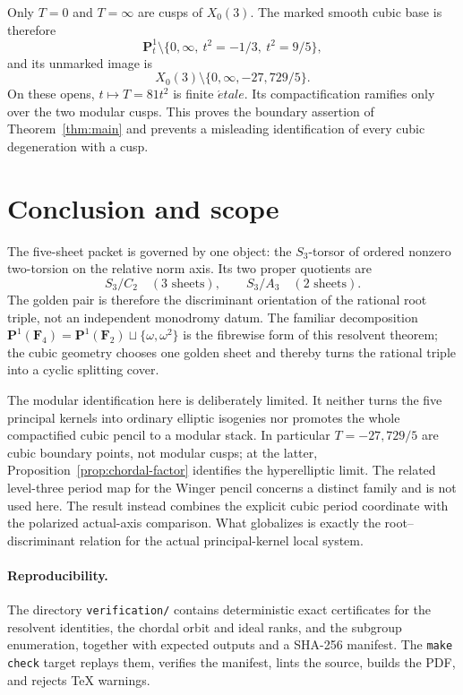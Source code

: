 \documentclass[11pt]{article}
\numberwithin{equation}{section}
\theoremstyle{definition}
\theoremstyle{remark}
\newcommand{\F}{\mathbf F}
\newcommand{\PP}{\mathbf P}
\begin{document}
Only \(T=0\) and \(T=\infty\) are cusps of \(X_0(3)\).  The marked smooth
cubic base is therefore
\[
 \PP^1_t\setminus
 \{0,\infty,\ t^2=-1/3,\ t^2=9/5\},
\]
and its unmarked image is
\[
 X_0(3)\setminus\{0,\infty,-27,729/5\}.
\]
On these opens, \(t\mapsto T=81t^2\) is finite \(\acute etale\).  Its
compactification ramifies only over the two modular cusps.  This proves the
boundary assertion of Theorem~\ref{thm:main} and prevents a misleading
identification of every cubic degeneration with a cusp.

\section{Conclusion and scope}

The five-sheet packet is governed by one object: the \(S_3\)-torsor of
ordered nonzero two-torsion on the relative norm axis.  Its two proper
quotients are
\[
 S_3/C_2\quad(3\text{ sheets}),
 \qquad
 S_3/A_3\quad(2\text{ sheets}).
\]
The golden pair is therefore the discriminant orientation of the rational
root triple, not an independent monodromy datum.  The familiar decomposition
\(\PP^1(\F_4)=\PP^1(\F_2)\sqcup\{\omega,\omega^2\}\) is the fibrewise
form of this resolvent theorem; the cubic geometry chooses one golden sheet
and thereby turns the rational triple into a cyclic splitting cover.

The modular identification here is deliberately limited.  It neither turns
the five principal kernels into ordinary elliptic isogenies nor promotes the
whole compactified cubic pencil to a modular stack.  In particular
\(T=-27,729/5\) are cubic boundary points, not modular cusps; at the latter,
Proposition~\ref{prop:chordal-factor} identifies the hyperelliptic limit.
The related level-three period map for the Winger pencil
\cite[Theorem~1.1 and Proposition~5.1]{LZ} concerns a distinct family and is
not used here.  The result instead combines the explicit cubic period
coordinate with the polarized actual-axis comparison.  What globalizes is
exactly the root--discriminant relation for the actual principal-kernel local
system.

\paragraph{Reproducibility.}
The directory \texttt{verification/} contains deterministic exact
certificates for the resolvent identities, the chordal orbit and ideal ranks,
and the subgroup enumeration, together with expected outputs and a SHA-256
manifest.  The \texttt{make check} target replays them, verifies the manifest,
lints the source, builds the PDF, and rejects TeX warnings.
\end{document}
